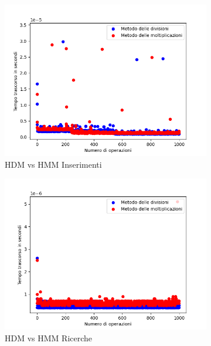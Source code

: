 \documentclass{article}
\begin{document}
			\begin{figure}[h]
				\centering
				
				\begin{subfigure}{0.49\textwidth}
					\centering
					\includegraphics[width = \textwidth]{HDM_HMM_Insertions}
					\caption{HDM vs HMM Inserimenti}
				\end{subfigure}
				\begin{subfigure}{0.49\textwidth}
					\centering
					\includegraphics[width = \textwidth]{HDM_HMM_Searches}
					\caption{HDM vs HMM Ricerche}
				\end{subfigure}
				\begin{subfigure}{0.49\textwidth}
					\centering

\end{subfigure}
\end{figure}
\end{document}
